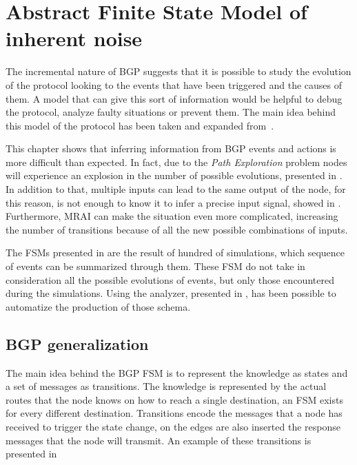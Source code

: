 \chapter[Abstract Finite State Model of inherent noise]{Abstract Finite State Model of \\inherent noise}
\label{cha:bgp_fsm}

The incremental nature of \ac{BGP} suggests that it is possible to study the
evolution of the protocol looking to the events that have been triggered
and the causes of them.
A model that can give this sort of information would be helpful to debug
the protocol, analyze faulty situations or prevent them.
The main idea behind this model of the protocol has been taken and
expanded from~\cite{griffinFSM}.

This chapter shows  that inferring information from \ac{BGP} events and actions
is more difficult than expected.
In fact, due to the \textit{Path Exploration} problem
nodes will experience an explosion in the number of possible evolutions,
presented in .
In addition to that, multiple inputs can lead to the same output of the node,
for this reason, is not enough to know it to infer a precise input signal,
showed in .
Furthermore, \ac{MRAI} can make the situation even more complicated, increasing
the number of transitions because of all the new possible combinations of
inputs.

The \ac{FSM}s presented in  are
the result of hundred of simulations, which sequence of events can be summarized
through them.
These FSM do not take in consideration all the possible evolutions of events,
but only those encountered during the simulations.
Using the analyzer, presented in , has been possible
to automatize the production of those schema.

\section{BGP generalization}
\label{sec:bgp_generalization}

The main idea behind the \ac{BGP} \ac{FSM} is to represent the knowledge as
states and a set of messages as transitions.
The knowledge is represented by the actual routes that the node knows on how
to reach a single destination, an \ac{FSM} exists for every different
destination.
Transitions encode the messages that a node has received to trigger the state change,
on the edges are also inserted the response messages that the node will transmit.
An example of these transitions is presented in 

